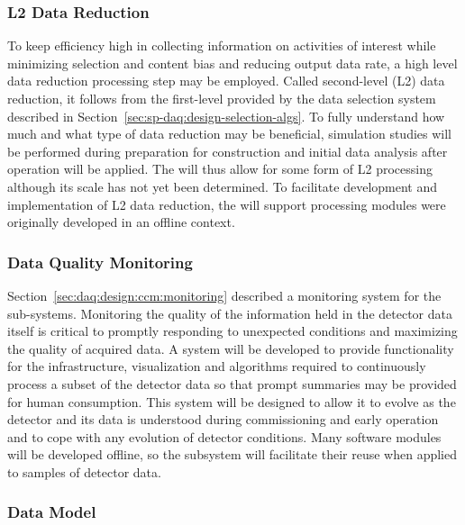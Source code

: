\subsubsection{L2 Data Reduction}
\label{sec:fd-daq:design-data-reduction}

To keep efficiency high in collecting information on activities of interest while minimizing selection and content bias and reducing output data rate, a high level data reduction processing step may be employed. 
Called second-level (L2) data reduction, it follows from the first-level provided by the data selection system described in Section~\ref{sec:sp-daq:design-selection-algs}.
To fully understand how much and what type of data reduction may be beneficial, simulation studies will be performed during preparation for construction and initial data analysis after operation will be applied. 
The  will thus allow for some form of L2 processing although its scale has not yet been determined. 
To facilitate development and implementation of L2 data reduction, the  will support processing modules were originally developed in an offline context.



\subsubsection{Data Quality Monitoring}
\label{sec:fd-daq:design-data-quality}

Section~\ref{sec:daq:design:ccm:monitoring} described a monitoring system for the  sub-systems. 
Monitoring the quality of the information held in the detector data itself is critical to promptly responding to unexpected conditions and maximizing the quality of acquired data. 
A   system will be developed to provide functionality for the infrastructure, visualization and algorithms required to continuously process a subset of the detector data so that prompt summaries may be provided for human consumption.
This system will be designed to allow it to evolve as the detector and its data is understood during commissioning and early operation and to cope with any evolution of detector conditions.
Many software modules will be developed offline, so the  subsystem will facilitate their reuse when applied to samples of detector data.


\subsubsection{Data Model}
\label{sec:fd-daq:design-data-model}

